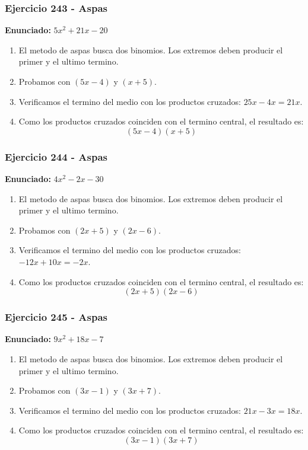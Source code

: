\documentclass[11pt,a4paper]{article}
\begin{document}
\vspace{0.2cm}
\subsubsection*{Ejercicio 243 - Aspas}
\textbf{Enunciado:} $ 5 x^{2} + 21 x - 20 $\par
\begin{enumerate}[leftmargin=2em]
\item El metodo de aspas busca dos binomios. Los extremos deben producir el primer y el ultimo termino.
\item Probamos con \((5 x - 4)\) y \((x + 5)\).
\item Verificamos el termino del medio con los productos cruzados: \(25 x- 4 x=21 x\).
\item Como los productos cruzados coinciden con el termino central, el resultado es: \[\boxed{\left(5 x - 4\right)\left(x + 5\right)}\]
\end{enumerate}

\vspace{0.2cm}
\subsubsection*{Ejercicio 244 - Aspas}
\textbf{Enunciado:} $ 4 x^{2} - 2 x - 30 $\par
\begin{enumerate}[leftmargin=2em]
\item El metodo de aspas busca dos binomios. Los extremos deben producir el primer y el ultimo termino.
\item Probamos con \((2 x + 5)\) y \((2 x - 6)\).
\item Verificamos el termino del medio con los productos cruzados: \(- 12 x+10 x=- 2 x\).
\item Como los productos cruzados coinciden con el termino central, el resultado es: \[\boxed{\left(2 x + 5\right)\left(2 x - 6\right)}\]
\end{enumerate}

\vspace{0.2cm}
\subsubsection*{Ejercicio 245 - Aspas}
\textbf{Enunciado:} $ 9 x^{2} + 18 x - 7 $\par
\begin{enumerate}[leftmargin=2em]
\item El metodo de aspas busca dos binomios. Los extremos deben producir el primer y el ultimo termino.
\item Probamos con \((3 x - 1)\) y \((3 x + 7)\).
\item Verificamos el termino del medio con los productos cruzados: \(21 x- 3 x=18 x\).
\item Como los productos cruzados coinciden con el termino central, el resultado es: \[\boxed{\left(3 x - 1\right)\left(3 x + 7\right)}\]
\end{enumerate}
\end{document}
